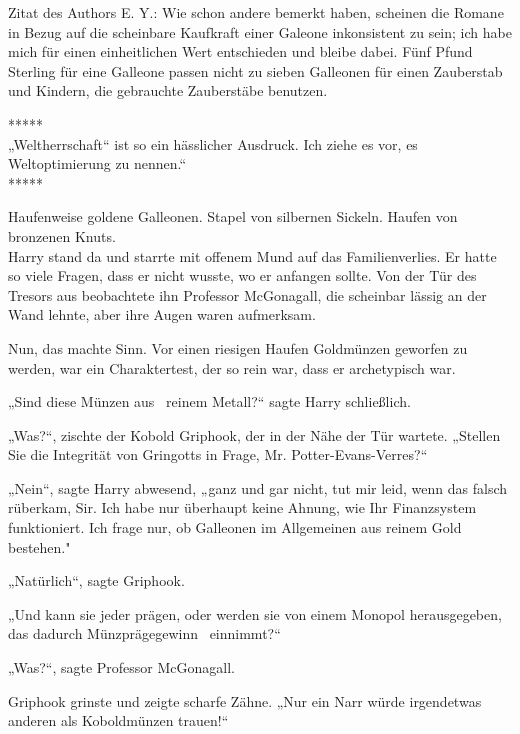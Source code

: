 

\hypertarget{die-hypothese-des-effizienten-marktes}{%

Zitat des Authors E. Y.: Wie schon andere bemerkt haben, scheinen die Romane in Bezug auf die scheinbare Kaufkraft einer Galeone inkonsistent zu sein; ich habe mich für einen einheitlichen Wert entschieden und bleibe dabei. Fünf Pfund Sterling für eine Galleone passen nicht zu sieben Galleonen für einen Zauberstab und Kindern, die gebrauchte Zauberstäbe benutzen. ~

*****\\ „Weltherrschaft“ ist so ein hässlicher Ausdruck. Ich ziehe es vor, es Weltoptimierung zu nennen.“ ~\\ *****

Haufenweise goldene Galleonen. Stapel von silbernen Sickeln. Haufen von bronzenen Knuts.\\ Harry stand da und starrte mit offenem Mund auf das Familienverlies. Er hatte so viele Fragen, dass er nicht wusste, wo er anfangen sollte. Von der Tür des Tresors aus beobachtete ihn Professor McGonagall, die scheinbar lässig an der Wand lehnte, aber ihre Augen waren aufmerksam.

Nun, das machte Sinn. Vor einen riesigen Haufen Goldmünzen geworfen zu werden, war ein Charaktertest, der so rein war, dass er archetypisch war.

„Sind diese Münzen aus ~reinem Metall?“ sagte Harry schließlich.

„Was?“, zischte der Kobold Griphook, der in der Nähe der Tür wartete. „Stellen Sie die Integrität von Gringotts in Frage, Mr. Potter-Evans-Verres?“

„Nein“, sagte Harry abwesend, „ganz und gar nicht, tut mir leid, wenn das falsch rüberkam, Sir. Ich habe nur überhaupt keine Ahnung, wie Ihr Finanzsystem funktioniert. Ich frage nur, ob Galleonen im Allgemeinen aus reinem Gold bestehen."

„Natürlich“, sagte Griphook.

„Und kann sie jeder prägen, oder werden sie von einem Monopol herausgegeben, das dadurch Münzprägegewinn ~einnimmt?“

„Was?“, sagte Professor McGonagall.

Griphook grinste und zeigte scharfe Zähne. „Nur ein Narr würde irgendetwas anderen als Koboldmünzen trauen!“

}
